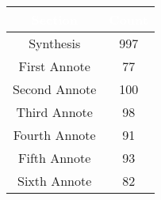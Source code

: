 \documentclass[conference]{IEEEtran}
\begin{document}
\begin{center}
  \begin{tcolorbox}[width=2.5 in]
    \begin{center}
      \begin{tabular}[h]{|c|c|}
          \hline
          \rowcolor{black} \textcolor{white}{Section} & \textcolor{white}{Count}\\
          \hline
          Synthesis & 997\\
          \hline
          \rowcolor{gray!25} First Annote & 77\\
          \hline
          Second Annote & 100\\
          \hline
          \rowcolor{gray!25} Third Annote & 98\\
          \hline
          Fourth Annote & 91\\
          \hline
          \rowcolor{gray!25} Fifth Annote & 93\\
          \hline
          Sixth Annote & 82\\
         \hline
      \end{tabular}
    \end{center}
  \end{tcolorbox}
\end{center}
\end{document}
